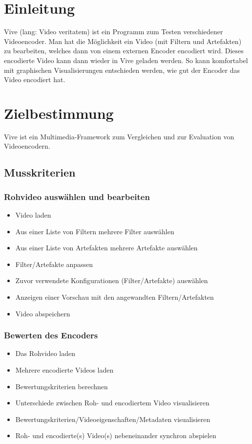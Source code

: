 \documentclass[parskip=full]{scrartcl}
\author {Carina Weber, Jan Benedikt Schwarz, Johannes Werner, Noel Schuhmacher,\\
Sascha Rapp, Simon Grafenhorst}
\begin{document}
\maketitle
\thispagestyle{empty}
\newpage
\tableofcontents
\newpage
\section{Einleitung}
Vive (lang: Video veritatem) ist ein Programm zum Testen verschiedener Videoencoder. Man hat die Möglichkeit ein Video (mit Filtern und Artefakten) zu bearbeiten, welches dann von einem externen Encoder encodiert wird. Dieses encodierte Video kann dann wieder in Vive geladen werden. So kann komfortabel mit graphischen Visualisierungen entschieden werden, wie gut der Encoder das Video encodiert hat.
\newpage
\section{Zielbestimmung}
Vive ist ein Multimedia-Framework zum Vergleichen und zur Evaluation von Videoencodern.
\subsection{Musskriterien}
\subsubsection{Rohvideo auswählen und bearbeiten}
\begin{itemize}
\item Video laden
\item Aus einer Liste von Filtern mehrere Filter auswählen
\item Aus einer Liste von Artefakten mehrere Artefakte auswählen
\item Filter/Artefakte anpassen
\item Zuvor verwendete Konfigurationen (Filter/Artefakte) auswählen
\item Anzeigen einer Vorschau mit den angewandten Filtern/Artefakten
\item Video abspeichern
\end{itemize}
\subsubsection{Bewerten des Encoders}
\begin{itemize}
\item Das Rohvideo laden
\item Mehrere encodierte Videos laden
\item Bewertungskriterien berechnen
\item Unterschiede zwischen Roh- und encodiertem Video visualisieren
\item Bewertungskriterien/Videoeigenschaften/Metadaten visualisieren
\item Roh- und encodierte(s) Video(s) nebeneinander synchron abspielen
\end{itemize}
\newpage
\end{document}
